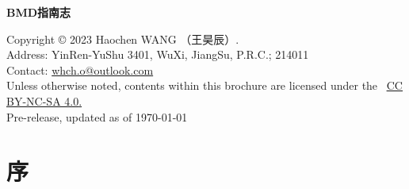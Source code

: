 \documentclass{article}
\begin{document}
\begin{titlepage} %



\begin{flushright} %
\fontsize{40}{0}\selectfont\textbf{BMD指南志} %
\end{flushright}


\begin{flushright} %
\fontsize{28}{0} %
\end{flushright}


\begin{flushright} %
\fontsize{20}{0} %
\end{flushright}


\begin{flushright} 
\fontsize{16}{16}\selectfont
\footnotesize{Copyright © 2023 Haochen WANG （王昊辰）.}\\
\footnotesize{Address: YinRen-YuShu 3401, WuXi, JiangSu, P.R.C.; 214011}\\
\footnotesize{Contact: \href{mailto:whch.o@outlook.com}{whch.o@outlook.com}}\\
\footnotesize{Unless otherwise noted, contents within this brochure are licensed under the \ccbyncsa\ \href{http://creativecommons.org/licenses/by-nc-sa/4.0/}{\uline{CC BY-NC-SA 4.0}.}}\\
\footnotesize{Pre-release, updated as of \today}
\end{flushright}


\end{titlepage} %

\fancyfoot[L]{\textcolor{light-gray}{Copyright © 2023 by Haochen WANG （王昊辰）}} %


\tableofcontents %


\newpage %

{\section{序}
\fontsize{11}{15}\selectfont %


\newpage
\newpage
\newpage
}
\end{document}
